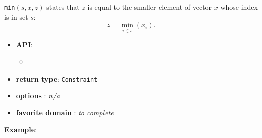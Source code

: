 \begin{notedef}
  \texttt{min}$(s,x,z)$ states that $z$ is equal to the smaller
  element of vector $x$ whose index is in set $s$:
$$z = \min_{i\in s}( x_i ).$$
\end{notedef}
\begin{itemize}
	\item \textbf{API}:
	\begin{itemize}
		\item {}
	\end{itemize}
	\item \textbf{return type}: \texttt{Constraint}
	\item \textbf{options} : \emph{n/a}
	\item \textbf{favorite domain} : \emph{to complete}
\end{itemize}

\textbf{Example}:

